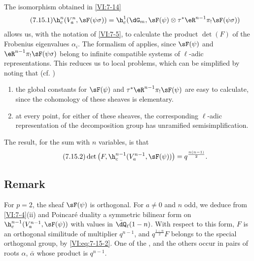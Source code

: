 The isomorphism obtained in \ref{VI:7-14} 
\begin{equation*}\tag{7.15.1}\label{VI:eq:7-15-1}
  \h_c^n(V_a^n,\sF(\psi\sigma)) = \h_c^1(\dG_m,\sF(\psi)\otimes \tau^\ast \eR^{n-1} \pi_! \sF(\psi\sigma)) 
\end{equation*}
allows us, with the notation of \ref{VI:7-5}, to calculate the product $\det(F)$ 
of the Frobenius eigenvalues $\alpha_i$. The formalism of \cite{de73} 
applies, since $\sF(\psi)$ and $\eR^{n-1} \pi_! \sF(\psi\sigma)$ 
belong to infinite compatible systems of $\ell$-adic 
representations. This reduces us to local problems, which can be 
simplified by noting that (cf. \cite[9.5]{de73}) 
\begin{enumerate}[\indent a)]
  \item the global constants for 
    $\sF(\psi)$ and $\tau^\ast \eR^{n-1} \pi_! \sF(\psi)$ are easy to calculate, since the cohomology of these sheaves is elementary. 
  \item at every point, for either of these sheaves, the 
    corresponding $\ell$-adic representation of the decomposition group 
    has unramified semisimplification. 
\end{enumerate}

The result, for the sum with $n$ variables, is that 
\begin{equation*}\tag{7.15.2}\label{VI:eq:7-15-2}
  \det\left(F,\h_c^{n-1}(V_a^{n-1},\sF(\psi))\right) = q^{\frac{n(n-1)}{2}} \text{.} 
\end{equation*}





\subsection{Remark}\label{VI:7-16}

For $p=2$, the sheaf $\sF(\psi)$ is orthogonal. For $a\ne 0$ and $n$ 
odd, we deduce from \ref{VI:7-4}(ii) and Poincaré duality a 
symmetric bilinear form on $\h_c^{n-1}(V_a^{n-1},\sF(\psi))$ with 
values in $\bar\dQ_\ell(1-n)$. With respect to this form, $F$ is an 
orthogonal similitude of multiplier $q^{n-1}$, and $q^{\frac{1-n}{2}} F$ 
belongs to the special orthogonal group, by \eqref{VI:eq:7-15-2}. One 
of the , and the others 
occur in pairs of roots $\alpha$, $\bar\alpha$ whose product is $q^{n-1}$. 

